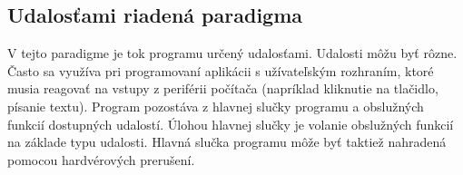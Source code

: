 \subsection{Udalosťami riadená paradigma}
\noindent V tejto paradigme je tok programu určený udalosťami. Udalosti môžu byť rôzne. Často sa využíva pri programovaní aplikácii s užívateľským rozhraním, ktoré musia reagovať na vstupy z periférii počítača (napríklad kliknutie na tlačidlo, písanie textu). Program pozostáva z hlavnej slučky programu a obslužných funkcií dostupných udalostí. Úlohou hlavnej slučky je volanie obslužných funkcií na základe typu udalosti. Hlavná slučka programu môže byť taktiež nahradená pomocou hardvérových prerušení.